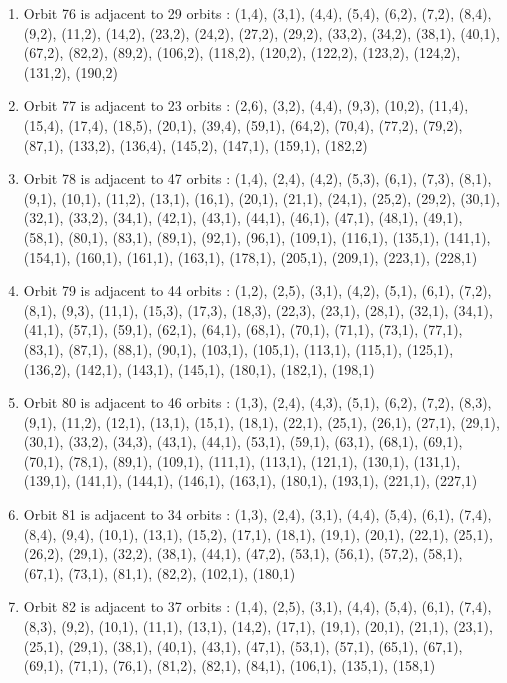 \documentclass[12pt]{article}
\begin{document}
\begin{enumerate}
\item Orbit 76 is adjacent to 29 orbits : (1,4), (3,1), (4,4), (5,4), (6,2), (7,2), (8,4), (9,2), (11,2), (14,2), (23,2), (24,2), (27,2), (29,2), (33,2), (34,2), (38,1), (40,1), (67,2), (82,2), (89,2), (106,2), (118,2), (120,2), (122,2), (123,2), (124,2), (131,2), (190,2)
\item Orbit 77 is adjacent to 23 orbits : (2,6), (3,2), (4,4), (9,3), (10,2), (11,4), (15,4), (17,4), (18,5), (20,1), (39,4), (59,1), (64,2), (70,4), (77,2), (79,2), (87,1), (133,2), (136,4), (145,2), (147,1), (159,1), (182,2)
\item Orbit 78 is adjacent to 47 orbits : (1,4), (2,4), (4,2), (5,3), (6,1), (7,3), (8,1), (9,1), (10,1), (11,2), (13,1), (16,1), (20,1), (21,1), (24,1), (25,2), (29,2), (30,1), (32,1), (33,2), (34,1), (42,1), (43,1), (44,1), (46,1), (47,1), (48,1), (49,1), (58,1), (80,1), (83,1), (89,1), (92,1), (96,1), (109,1), (116,1), (135,1), (141,1), (154,1), (160,1), (161,1), (163,1), (178,1), (205,1), (209,1), (223,1), (228,1)
\item Orbit 79 is adjacent to 44 orbits : (1,2), (2,5), (3,1), (4,2), (5,1), (6,1), (7,2), (8,1), (9,3), (11,1), (15,3), (17,3), (18,3), (22,3), (23,1), (28,1), (32,1), (34,1), (41,1), (57,1), (59,1), (62,1), (64,1), (68,1), (70,1), (71,1), (73,1), (77,1), (83,1), (87,1), (88,1), (90,1), (103,1), (105,1), (113,1), (115,1), (125,1), (136,2), (142,1), (143,1), (145,1), (180,1), (182,1), (198,1)
\item Orbit 80 is adjacent to 46 orbits : (1,3), (2,4), (4,3), (5,1), (6,2), (7,2), (8,3), (9,1), (11,2), (12,1), (13,1), (15,1), (18,1), (22,1), (25,1), (26,1), (27,1), (29,1), (30,1), (33,2), (34,3), (43,1), (44,1), (53,1), (59,1), (63,1), (68,1), (69,1), (70,1), (78,1), (89,1), (109,1), (111,1), (113,1), (121,1), (130,1), (131,1), (139,1), (141,1), (144,1), (146,1), (163,1), (180,1), (193,1), (221,1), (227,1)
\item Orbit 81 is adjacent to 34 orbits : (1,3), (2,4), (3,1), (4,4), (5,4), (6,1), (7,4), (8,4), (9,4), (10,1), (13,1), (15,2), (17,1), (18,1), (19,1), (20,1), (22,1), (25,1), (26,2), (29,1), (32,2), (38,1), (44,1), (47,2), (53,1), (56,1), (57,2), (58,1), (67,1), (73,1), (81,1), (82,2), (102,1), (180,1)
\item Orbit 82 is adjacent to 37 orbits : (1,4), (2,5), (3,1), (4,4), (5,4), (6,1), (7,4), (8,3), (9,2), (10,1), (11,1), (13,1), (14,2), (17,1), (19,1), (20,1), (21,1), (23,1), (25,1), (29,1), (38,1), (40,1), (43,1), (47,1), (53,1), (57,1), (65,1), (67,1), (69,1), (71,1), (76,1), (81,2), (82,1), (84,1), (106,1), (135,1), (158,1)

\end{enumerate}
\end{document}
